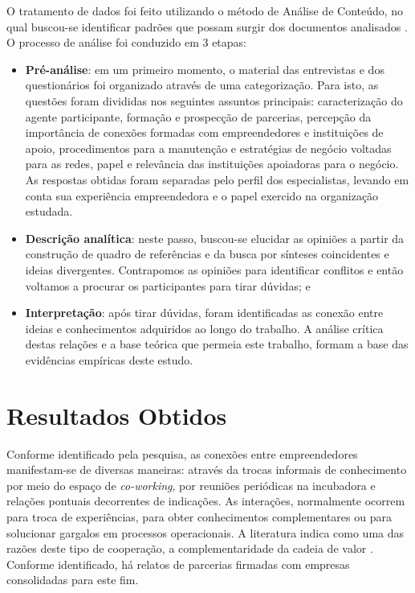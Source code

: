 \documentclass{sig-alternate-05-2015}
\begin{document}
O tratamento de dados foi feito utilizando o método de Análise de Conteúdo, no qual buscou-se identificar padrões que possam surgir dos documentos analisados \cite{bardin-09}. O processo de análise foi conduzido em 3 etapas: 

\begin{itemize}
	\item \textbf{Pré-análise}: em um primeiro momento, o material das entrevistas e dos questionários foi organizado através de uma categorização. Para isto, as questões foram divididas nos seguintes assuntos principais: caracterização do agente participante, formação e prospecção de parcerias, percepção da importância de conexões formadas com empreendedores e instituições de apoio, procedimentos para a manutenção e estratégias de negócio voltadas para  as redes, papel e relevância das instituições apoiadoras para o negócio. As respostas obtidas foram separadas pelo perfil dos especialistas, levando em conta sua experiência empreendedora e o papel exercido na organização estudada.
	
	\item \textbf{Descrição analítica}: neste passo, buscou-se elucidar as opiniões a partir da construção de quadro de referências e da busca por sínteses coincidentes e ideias divergentes. Contrapomos as opiniões para identificar conflitos e então voltamos a procurar os participantes para tirar dúvidas; e 
	
	\item \textbf{Interpretação}: após tirar dúvidas, foram identificadas as conexão entre ideias e conhecimentos adquiridos ao longo do trabalho. A análise crítica destas relações e a base teórica que permeia este trabalho, formam a base das evidências empíricas deste estudo.
\end{itemize}

\section{Resultados Obtidos}
Conforme identificado pela pesquisa, as conexões entre empreendedores manifestam-se de diversas maneiras: através da trocas informais de conhecimento por meio do espaço de \textit{co-working}, por reuniões periódicas na incubadora e relações pontuais decorrentes de indicações. As interações, normalmente ocorrem para troca de experiências, para obter conhecimentos complementares ou para solucionar gargalos em processos operacionais. A literatura indica como uma das razões deste tipo de cooperação, a complementaridade da cadeia de valor \cite{candido-souza-15}. Conforme identificado, há relatos de parcerias firmadas com empresas consolidadas para este fim.
\end{document}
